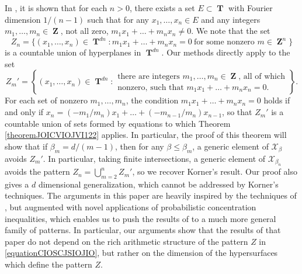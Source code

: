 \documentclass[12pt,reqno]{article}
\numberwithin{equation}{section}
\DeclareMathOperator{\ZZ}{\mathbf{Z}}
\DeclareMathOperator{\TT}{\mathbf{T}}
\numberwithin{theorem}{section}
\begin{document}
In \cite{Korner2}, it is shown that for each $n > 0$, there exists a set $E \subset \TT$ with Fourier dimension $1/(n-1)$ such that for any $x_1,\dots,x_n \in E$ and any integers $m_1,\dots,m_n \in \ZZ$, not all zero, $m_1x_1 + \dots + m_nx_n \neq 0$. We note that the set
%
\begin{equation} \label{equationCIOSCJSIOJIO}
    Z_n = \{ (x_1,\dots,x_n) \in \TT^{dn}: m_1x_1 + \dots + m_nx_n = 0\ \text{for some nonzero $m \in \ZZ^n$} \}
\end{equation}
%
is a countable union of hyperplanes in $\TT^{dn}$. Our methods directly apply to the set
%
\[ Z_m' = \left\{ (x_1,\dots,x_n) \in \TT^{dn}: \begin{array}{c}
            \text{there are integers $m_1,\dots,m_n \in \ZZ$, all of which}\\
            \text{nonzero, such that $m_1x_1 + \dots + m_nx_n = 0$.}
        \end{array} \right\}. \]
%
For each set of nonzero $m_1,\dots,m_n$, the condition $m_1x_1 + \dots + m_nx_n = 0$ holds if and only if $x_n = (-m_1/m_n) x_1 + \dots + (-m_{n-1}/m_n) x_{n-1}$, so that $Z_m'$ is a countable union of sets formed by equations to which Theorem \ref{theoremJOICVIOJVI122} applies. In particular, the proof of this theorem will show that if $\beta_m = d/(m-1)$, then for any $\beta \leq \beta_m$, a generic element of $\mathcal{X}_\beta$ avoids $Z_m'$. In particular, taking finite intersections, a generic element of $\mathcal{X}_{\beta_n}$ avoids the pattern $Z_n = \bigcup_{m = 2}^n Z_m'$, so we recover Korner's result. Our proof also gives a $d$ dimensional generalization, which cannot be addressed by Korner's techniques. The arguments in this paper are heavily inspired by the techniques of \cite{Korner2}, but augmented with novel applications of probabilistic concentration inequalities, which enables us to push the results of \cite{Korner2} to a much more general family of patterns. In particular, our arguments show that the results of that paper do not depend on the rich arithmetic structure of the pattern $Z$ in \eqref{equationCIOSCJSIOJIO}, but rather on the dimension of the hypersurfaces which define the pattern $Z$.

\end{document}
